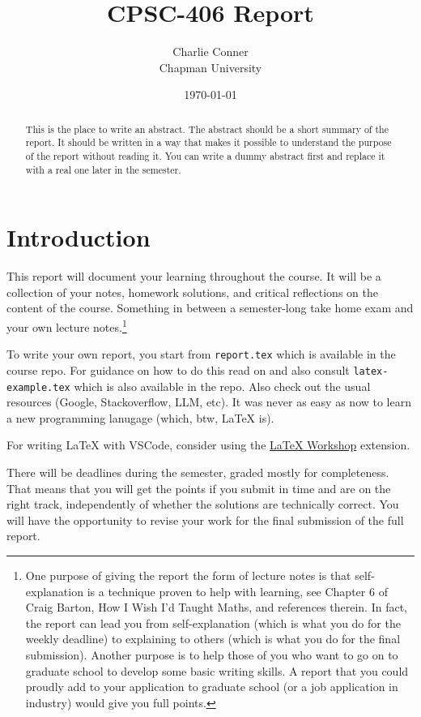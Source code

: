 \documentclass{article}
\title{CPSC-406 Report}
\author{Charlie Conner  \\ Chapman University}
\date{\today}
\theoremstyle{theorem}
\theoremstyle{definition}
\theoremstyle{remark}
\begin{document}
\maketitle

\begin{abstract}
This is the place to write an abstract. The abstract should be a short summary of the report. It should be written in a way that makes it possible to understand the purpose of the report without reading it. You can write a dummy abstract first and replace it with a real one later in the semester.
\end{abstract}

\setcounter{tocdepth}{3}
\tableofcontents

\section{Introduction}\label{intro}

This report will document your learning throughout the course. It will be a collection of your notes, homework solutions, and critical reflections on the content of the course. Something in between a semester-long take home exam and your own lecture notes.\footnote{One purpose of giving the report the form of lecture notes is that self-explanation is a technique proven to help with learning, see Chapter 6 of Craig Barton, How I Wish I'd Taught Maths, and references therein. In fact, the report can lead you from self-explanation (which is what you do for the weekly deadline) to explaining to others (which is what you do for the final submission). Another purpose is to help those of you who want to go on to graduate school to develop some basic writing skills. A report that you could proudly add to your application to graduate school (or a job application in industry) would give you full points.}

To write your own report, you start from \texttt{report.tex} which is available in the course repo. For guidance on how to do this read on and also consult \texttt{latex-example.tex} which is also available in the repo. Also check out the usual resources (Google, Stackoverflow, LLM, etc). It was never as easy as now to learn a new programming lanugage (which, btw, \LaTeX{} is).

For writing \LaTeX{} with VSCode, consider using the \href{https://marketplace.visualstudio.com/items?itemName=James-Yu.latex-workshop}{\LaTeX{} Workshop} extension. 

There will be deadlines during the semester, graded mostly for completeness. That means that you will get the points if you submit in time and are on the right track, independently of whether the solutions are technically correct. You will have the opportunity to revise your work for the final submission of the full report.
\end{document}
